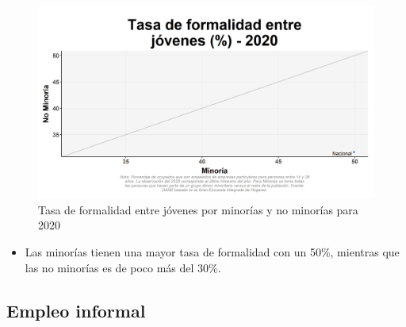     \begin{figure}[H]
        \caption{Tasa de formalidad entre jóvenes por minorías y no minorías para 2020 \label{map_result_2} }
        \begin{center}
        \includegraphics[width=\textwidth,keepaspectratio]{img/var_64_scatter.png}
        \end{center}
    \end{figure}
            \begin{itemize}
                \item Las minorías tienen una mayor tasa de formalidad con un 50\%, mientras que las no minorías es de poco más del 30\%.
                \end{itemize}

    \subsection{Empleo informal}

